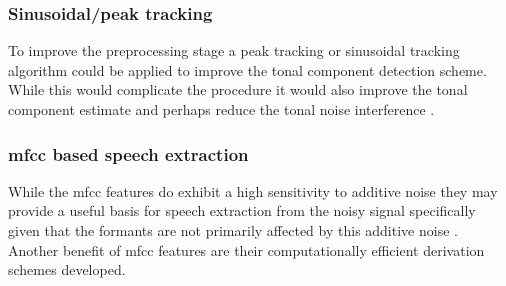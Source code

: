 \subsubsection{Sinusoidal/peak tracking}
To improve the preprocessing stage a peak tracking or sinusoidal tracking algorithm could be applied to improve the tonal component detection scheme. While this would complicate the procedure it would also improve the tonal component estimate and perhaps reduce the tonal noise interference \cite{McAulay1986}.

\subsubsection{\gls{mfcc} based speech extraction}\label{corrections:mfcc2}
While the \gls{mfcc} features do exhibit a high sensitivity to additive noise they may provide a useful basis for speech extraction from the noisy signal specifically given that the formants are not primarily affected by this additive noise \cite{Tyagi2005}. Another benefit of \gls{mfcc} features are their computationally efficient derivation schemes developed.



